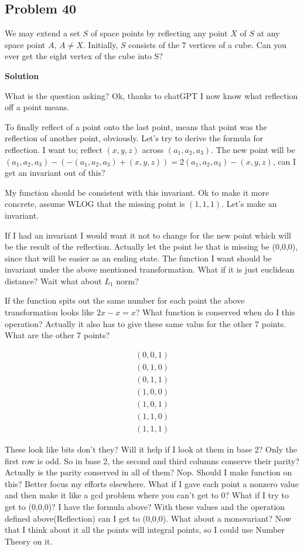 \documentclass[12pt,tikz,border=10pt]{article}
\theoremstyle{definition}
\theoremstyle{remark}
\begin{document}
\subsection{Problem 40}

We may extend a set $S$ of space points by reflecting any point $X$ of $S$ at any space
point $A$, $A \neq X$. Initially, $S$ consists of the 7 vertices of a cube. Can you ever get
the eight vertex of the cube into S?

\textbf{Solution}

What is the question asking? Ok, thanks to chatGPT I now know what reflection off a point means.

To finally reflect of a point onto the last point, means that point was the reflection of another point, obviously.
Let's try to derive the formula for reflection. I want to; reflect $(x,y,z)$ across $(a_1,a_2,a_3)$. The
new point will be $(a_1,a_2,a_3)-(-(a_1,a_2,a_3)+(x,y,z))=2(a_1,a_2,a_3)-(x,y,z)$, can I get an invariant out of this?

My function should be consistent with this invariant. Ok to make it more concrete,
assume WLOG that the missing point is $(1,1,1)$. Let's make an invariant.

If I had an invariant I would want it not to change for the new point which will be the result of the reflection. 
Actually let the point be that is missing be (0,0,0), since that will be easier as an ending state. The function I want should be 
invariant under the above mentioned transformation. What if it is just euclidean distance? Wait what about $L_{1}$ norm?

If the function spits out the same number for each point the above transformation looks like $2x-x=x$? What function is conserved when do I this operation?
Actually it also has to give these same valus for the other 7 points. What are the other 7 points?


\begin{align*}
  (0,0,1)\\
  (0,1,0)\\
  (0,1,1)\\
  (1,0,0)\\
  (1,0,1)\\
  (1,1,0)\\
  (1,1,1)
\end{align*}

These look like bits don't they? Will it help if I look at them in base 2? Only the first row is odd. So 
in base 2, the second and third columns conserve their parity? Actually is the parity conserved in all of them? Nop.
Should I make function on this? Better focus my efforts elsewhere. What if I gave each point a nonzero value and then make it like a gcd problem
where you can't get to 0? What if I try to get to (0,0,0)? I have the formula above? With these values and the operation defined above(Reflection) 
can I get to (0,0,0). What about a monovariant? Now that I think about it all the points will integral points, so I could use Number Theory on it.
\end{document}
